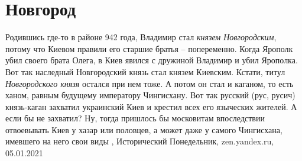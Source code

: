  
 
 
 
 
\chapter{Новгород}

Родившись где-то в районе 942 года, Владимир стал \emph{князем Новгородским}, потому
что Киевом правили его старшие братья – попеременно. Когда Ярополк убил своего
брата Олега, в Киев явился с дружиной Владимир и убил Ярополка. Вот так
наследный Новгородский князь стал князем Киевским. Кстати, титул \emph{Новгородского
князя} остался при нем тоже. А потом он стал и каганом, то есть ханом, равным
будущему императору Чингисхану.  Вот так русский (рус, русич) князь-каган
захватил украинский Киев и крестил всех его языческих жителей. А если бы не
захватил?  Ну, тогда пришлось бы московитам впоследствии отвоевывать Киев у
хазар или половцев, а может даже у самого Чингисхана, имевшего на него свои
виды
,
Исторический Понедельник, zen.yandex.ru, 05.01.2021 

